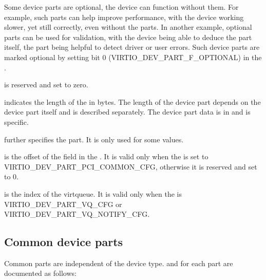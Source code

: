 Some device parts are optional, the device can function without them.
For example, such parts can help improve performance, with the device working
slower, yet still correctly, even without the parts. In another example,
optional parts can be used for validation, with the device being able to deduce
the part itself, the part being helpful to detect driver or user errors.
Such device parts are marked optional by setting bit 0
(VIRTIO_DEV_PART_F_OPTIONAL) in the .

 is reserved and set to zero.

 indicates the length of the  in bytes. The length
of the device part depends on the device part itself and is described separately.
The device part data is in  and is  specific.

 further specifies the part. It is only used for some
 values.

 is the offset of the
field in the . It is valid only when the  is set to VIRTIO_DEV_PART_PCI_COMMON_CFG,
otherwise it is reserved and set to 0.

 is the index of the virtqueue. It is valid
only when the  is VIRTIO_DEV_PART_VQ_CFG or
VIRTIO_DEV_PART_VQ_NOTIFY_CFG.

\subsection{Common device parts}\label{sec:Basic Facilities of a Virtio Device / Device parts / Common device parts}

Common parts are independent of the device type.
 and  for each part are documented as follows:

